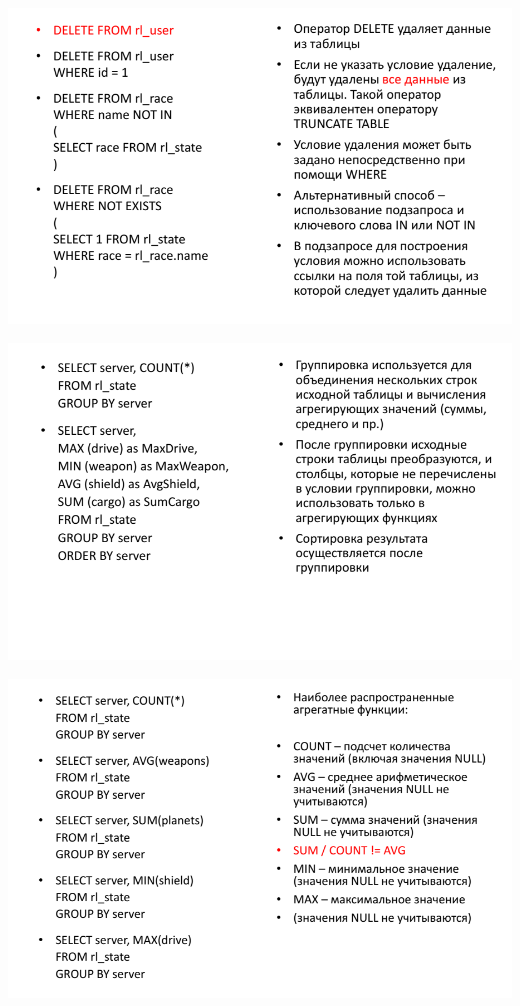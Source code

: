 \documentclass{beamer}
\begin{document}
\begin{frame}
\begin{center}
\includegraphics[scale=0.5]{images/delete-01.png}
\end{center}
\end{frame} 

\begin{frame}
\begin{center}
\includegraphics[scale=0.5]{images/group.png}
\end{center}
\end{frame} 

\begin{frame}
\begin{center}
\includegraphics[scale=0.5]{images/avg.png}
\end{center}
\end{frame} 
\end{document}
